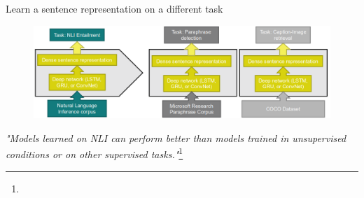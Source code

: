 \documentclass[12pt]{beamer}
\begin{document}
\begin{frame}{Learn a sentence representation on a different task}
	
\begin{figure}
	\includegraphics[width=0.9\linewidth]{img/transfer.png}
\end{figure}

\begin{small}
\emph{"Models learned on NLI can perform better than models trained in unsupervised conditions or on other supervised tasks."}\footnote{}
\end{small}

	
\end{frame}
\end{document}
